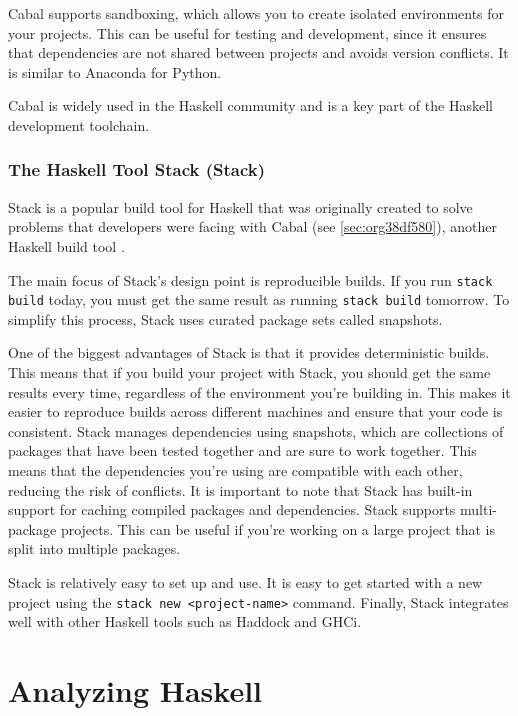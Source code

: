 \documentclass[a4paper, titlepage, twoside]{article}
\begin{document}
Cabal supports sandboxing, which allows you to create isolated environments for your projects. This can be useful for testing and development, since it ensures that dependencies are not shared between projects and avoids version conflicts. It is similar to Anaconda for Python.

Cabal is widely used in the Haskell community and is a key part of the Haskell development toolchain.

\subsubsection{The Haskell Tool Stack (Stack)}
\label{sec:orged7a2d6}

Stack is a popular build tool for Haskell that was originally created to solve problems that developers were facing with Cabal (see \ref{sec:org38df580}), another Haskell build tool \autocite{CommercialhaskellStack2023}.

The main focus of Stack's design point is reproducible builds. If you run \texttt{stack build} today, you must get the same result as running \texttt{stack build} tomorrow. To simplify this process, Stack uses curated package sets called snapshots.

One of the biggest advantages of Stack is that it provides deterministic builds. This means that if you build your project with Stack, you should get the same results every time, regardless of the environment you're building in. This makes it easier to reproduce builds across different machines and ensure that your code is consistent. Stack manages dependencies using snapshots, which are collections of packages that have been tested together and are sure to work together. This means that the dependencies you're using are compatible with each other, reducing the risk of conflicts. It is important to note that Stack has built-in support for caching compiled packages and dependencies. Stack supports multi-package projects. This can be useful if you're working on a large project that is split into multiple packages.

Stack is relatively easy to set up and use. It is easy to get started with a new project using the \texttt{stack new <project-name>} command. Finally, Stack integrates well with other Haskell tools such as Haddock and GHCi.

\section{Analyzing Haskell}
\label{sec:orgea3d656}
\end{document}
